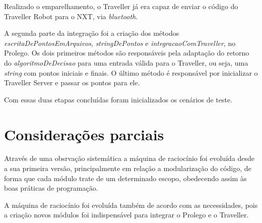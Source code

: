 	Realizado o emparelhamento, o Traveller já era capaz de enviar o código do Traveller Robot para o NXT, via \textit{bluetooth}.

	A segunda parte da integração foi a criação dos métodos \textit{escritaDePontosEmArquivos}, \textit{stringDePontos} e \textit{integracaoComTraveller}, no Prolego. Os dois primeiros métodos são responsáveis pela adaptação do retorno do \textit{algoritmoDeDecisao} para uma entrada válida para o Traveller, ou seja, uma \textit{string} com pontos iniciais e finais. O último método é responsável por inicializar o Traveller Server e passar os pontos para ele.
	
	Com essas duas etapas concluídas foram inicializados os cenários de teste.
	
\section{Considerações parciais}
	Através de uma obsrvação sistemática a máquina de raciocínio foi evoluída desde a sua primeira versão, principalmente em relação a modularização do código, de forma que cada módulo trate de um determinado escopo, obedecendo assim às boas práticas de programação. 

	A máquina de raciocínio foi evoluída também de acordo com as necessidades, pois a criação novos módulos foi indispensável para integrar o Prolego e o Traveller.
	